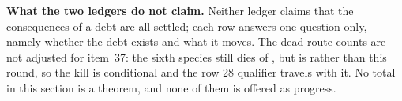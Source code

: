 \begin{qbox}
\textbf{What the two ledgers do not claim.} Neither ledger claims that the consequences of a debt are all
settled; each row answers one question only, namely whether the debt exists and what it moves. The
dead-route counts are not adjusted for item~37: the sixth species still dies of , but
 is \LC{} rather than \LT{} this round, so the kill is conditional and the row 28 qualifier
travels with it. No total in this section is a theorem, and none of them is offered as progress.
\end{qbox}
